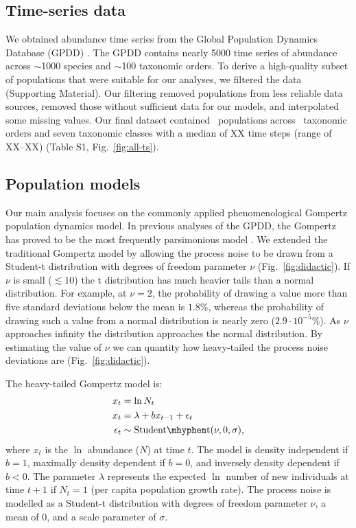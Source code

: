 \subsection{Time-series data}

We obtained abundance time series from the Global Population Dynamics Database
(GPDD) \citep{gpdd2010}. The GPDD contains nearly 5000 time series of abundance
across $\sim$1000 species and $\sim$100 taxonomic orders. To derive
a high-quality subset of populations that were suitable for our analyses, we
filtered the data (Supporting Material). Our filtering removed populations from
less reliable data sources, removed those without sufficient data for our
models, and interpolated some missing values. Our final dataset contained
\NPops~populations across \NOrders~taxonomic orders and seven taxonomic classes
with a median of XX time steps (range of XX--XX) (Table S1,
Fig.~\ref{fig:all-ts}).

\subsection{Population models}

Our main analysis focuses on the commonly applied phenomenological Gompertz
population dynamics model. In previous analyses of the GPDD, the Gompertz has
proved to be the most frequently parsimonious model \citep{brook2006}. We
extended the traditional Gompertz model by allowing the process noise to be
drawn from a Student-t distribution with degrees of freedom parameter $\nu$
(Fig.~\ref{fig:didactic}). If $\nu$ is small ($\lesssim 10$) the t distribution
has much heavier tails than a normal distribution. For example, at $\nu = 2$,
the probability of drawing a value more than five standard deviations below the
mean is $1.8$\%, whereas the probability of drawing such a value from a normal
distribution is nearly zero ($2.9\cdot10^{-5}$\%). As $\nu$ approaches infinity
the distribution approaches the normal distribution. By estimating the value of
$\nu$ we can quantity how heavy-tailed the process noise deviations are
(Fig.~\ref{fig:didactic}).

The heavy-tailed Gompertz model is:
\begin{align*}
x_t &= \ln N_t\\
x_t &= \lambda + b x_{t-1} + \epsilon_t\\
\epsilon_t &\sim \mathrm{Student\mhyphen t}(\nu, 0, \sigma),
\end{align*}
where $x_t$ is the $\ln$ abundance ($N$) at time $t$. The model is density
independent if $b = 1$, maximally density dependent if $b = 0$, and inversely
density dependent if $b < 0$. The parameter $\lambda$ represents the expected
$\ln$ number of new individuals at time $t + 1$ if $N_t = 1$ (per capita
population growth rate). The process noise is modelled as a Student-t
distribution with degrees of freedom parameter $\nu$, a mean of $0$, and
a scale parameter of $\sigma$.

